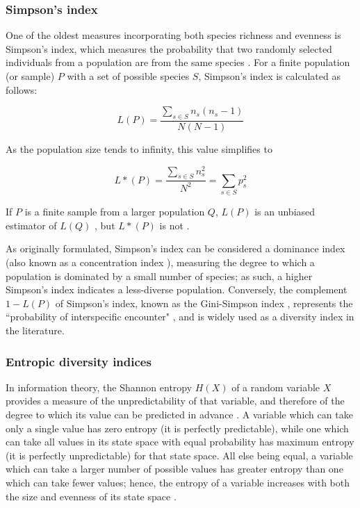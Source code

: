 \subsubsection{Simpson's index}

One of the oldest measures incorporating both species richness and evenness is Simpson's index, which measures the probability that two randomly selected individuals from a population are from the same species \citep{simpson1949diversity}. For a finite population (or sample) $P$ with a set of possible species $S$, Simpson's index is calculated as follows:

\begin{equation}
L(P) = \frac{\sum_{s \in S} n_s(n_s-1)}{N(N-1)}
\label{eq:simpson_finite}
\end{equation} 

As the population size tends to infinity, this value simplifies to

\begin{equation}
L*(P) = \frac{\sum_{s \in S} n_s^2}{N^2} = \sum_{s \in S} p_s^2
\label{eq:simpson_finite}
\end{equation} 

If $P$ is a finite sample from a larger population $Q$, $L(P)$ is an unbiased estimator of $L(Q)$ , but $L*(P)$ is not \citep{simpson1949diversity}.

As originally formulated, Simpson's index can be considered a dominance index (also known as a concentration  index \citep{simpson1949diversity}), measuring the degree to which a population is dominated by a small number of species; as such, a higher Simpson's index indicates a less-diverse population. Conversely, the complement $1-L(P)$ of Simpson's index, known as the Gini-Simpson index \citep{jost2006entropy}, represents the ``probability of interspecific encounter" \citep{peet1974diversity}, and is widely used as a diversity index in the literature.

\subsubsection{Entropic diversity indices}

In information theory, the Shannon entropy $H(X)$ of a random variable $X$ provides a measure of the unpredictability of that variable, and therefore of the degree to which its value can be predicted in advance \citep{shannon1948communication1}. A variable which can take only a single value has zero entropy (it is perfectly predictable), while one which can take all values in its state space with equal probability has maximum entropy (it is perfectly unpredictable) for that state space. All else being equal, a variable which can take a larger number of possible values has greater entropy than one which can take fewer values; hence, the entropy of a variable increases with both the size and evenness of its state space \citep{shannon1948communication1}.

